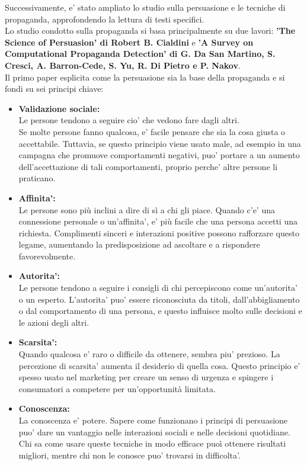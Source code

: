 \documentclass{article}
\begin{document}
\newpage

Successivamente, e' stato ampliato lo studio sulla persuasione e le tecniche di propaganda, approfondendo la lettura di testi specifici.\\
Lo studio condotto sulla propaganda si basa principalmente su due lavori: \textbf{'The Science of Persuasion' di Robert B. Cialdini} e \textbf{'A Survey on Computational Propaganda Detection' di G. Da San Martino, S. Cresci, A. Barron-Cede, S. Yu, R. Di Pietro e P. Nakov}.\\
Il primo paper esplicita come la persuasione sia la base della propaganda e si fondi su sei principi chiave:
\begin{itemize}
	\item \textbf{Validazione sociale:}\\
	Le persone tendono a seguire cio' che vedono fare dagli altri.\\
	Se molte persone fanno qualcosa, e' facile pensare che sia la cosa giusta o accettabile. Tuttavia, se questo principio viene usato male, ad esempio in una campagna che promuove comportamenti negativi, puo' portare a un aumento dell'accettazione di tali comportamenti, proprio perche' altre persone li praticano.
	\item \textbf{Affinita':}\\
	Le persone sono più inclini a dire di sì a chi gli piace. Quando c’e' una connessione personale o un’affinita', e' più facile che una persona accetti una richiesta. Complimenti sinceri e interazioni positive possono rafforzare questo legame, aumentando la predisposizione ad ascoltare e a rispondere favorevolmente.
	\item \textbf{Autorita':}\\
	Le persone tendono a seguire i consigli di chi percepiscono come un'autorita' o un esperto. L'autorita' puo' essere riconosciuta da titoli, dall'abbigliamento o dal comportamento di una persona, e questo influisce molto sulle decisioni e le azioni degli altri.
	\item \textbf{Scarsita':}\\
	Quando qualcosa e' raro o difficile da ottenere, sembra piu' prezioso. La percezione di scarsita' aumenta il desiderio di quella cosa. Questo principio e' spesso usato nel marketing per creare un senso di urgenza e spingere i consumatori a competere per un'opportunità limitata.
	\item \textbf{Conoscenza:}\\
	La conoscenza e' potere. Sapere come funzionano i principi di persuasione puo' dare un vantaggio nelle interazioni sociali e nelle decisioni quotidiane. Chi sa come usare queste tecniche in modo efficace puoì ottenere risultati migliori, mentre chi non le conosce puo' trovarsi in difficolta'.
\end{itemize}
\end{document}
